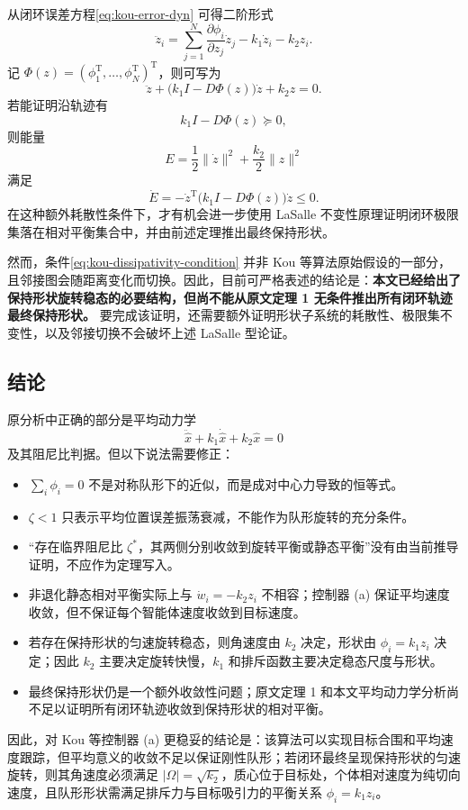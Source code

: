 从闭环误差方程\eqref{eq:kou-error-dyn} 可得二阶形式
\begin{equation}
\ddot{z}_i
=\sum_{j=1}^N\frac{\partial\phi_i}{\partial z_j}\dot{z}_j
-k_1\dot{z}_i-k_2z_i .
\end{equation}
记 $\Phi(z)=(\phi_1^\mathrm{T},\ldots,\phi_N^\mathrm{T})^\mathrm{T}$，则可写为
\begin{equation}
\ddot{z}+\bigl(k_1I-D\Phi(z)\bigr)\dot{z}+k_2z=0. \label{eq:kou-second-order-full}
\end{equation}
若能证明沿轨迹有
\begin{equation}
k_1I-D\Phi(z)\succeq0, \label{eq:kou-dissipativity-condition}
\end{equation}
则能量
\begin{equation}
E=\frac{1}{2}\|\dot{z}\|^2+\frac{k_2}{2}\|z\|^2
\end{equation}
满足
\begin{equation}
\dot{E}=-\dot{z}^\mathrm{T}\bigl(k_1I-D\Phi(z)\bigr)\dot{z}\leq0.
\end{equation}
在这种额外耗散性条件下，才有机会进一步使用 LaSalle 不变性原理证明闭环极限集落在相对平衡集合中，并由前述定理推出最终保持形状。

然而，条件\eqref{eq:kou-dissipativity-condition} 并非 Kou 等算法原始假设的一部分，且邻接图会随距离变化而切换。因此，目前可严格表述的结论是：\textbf{本文已经给出了保持形状旋转稳态的必要结构，但尚不能从原文定理 1 无条件推出所有闭环轨迹最终保持形状。} 要完成该证明，还需要额外证明形状子系统的耗散性、极限集不变性，以及邻接切换不会破坏上述 LaSalle 型论证。

\subsection{结论}

原分析中正确的部分是平均动力学
\[
\ddot{\hat{x}}+k_1\dot{\hat{x}}+k_2\hat{x}=0
\]
及其阻尼比判据。但以下说法需要修正：
\begin{itemize}
    \item $\sum_i\phi_i=0$ 不是对称队形下的近似，而是成对中心力导致的恒等式。
    \item $\zeta<1$ 只表示平均位置误差振荡衰减，不能作为队形旋转的充分条件。
    \item “存在临界阻尼比 $\zeta^\ast$，其两侧分别收敛到旋转平衡或静态平衡”没有由当前推导证明，不应作为定理写入。
    \item 非退化静态相对平衡实际上与 $\dot{w}_i=-k_2z_i$ 不相容；控制器 (a) 保证平均速度收敛，但不保证每个智能体速度收敛到目标速度。
    \item 若存在保持形状的匀速旋转稳态，则角速度由 $k_2$ 决定，形状由 $\phi_i=k_1z_i$ 决定；因此 $k_2$ 主要决定旋转快慢，$k_1$ 和排斥函数主要决定稳态尺度与形状。
    \item 最终保持形状仍是一个额外收敛性问题；原文定理 1 和本文平均动力学分析尚不足以证明所有闭环轨迹收敛到保持形状的相对平衡。
\end{itemize}

因此，对 Kou 等控制器 (a) 更稳妥的结论是：该算法可以实现目标合围和平均速度跟踪，但平均意义的收敛不足以保证刚性队形；若闭环最终呈现保持形状的匀速旋转，则其角速度必须满足 $|\Omega|=\sqrt{k_2}$，质心位于目标处，个体相对速度为纯切向速度，且队形形状需满足排斥力与目标吸引力的平衡关系 $\phi_i=k_1z_i$。
